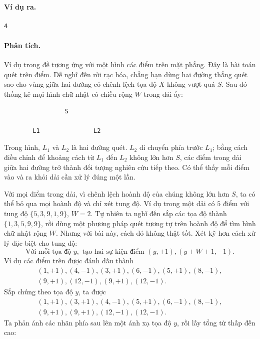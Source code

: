 \documentclass[11pt]{article}
\begin{document}
\paragraph{Ví dụ ra.}
\begin{verbatim}
4
\end{verbatim}

\paragraph{Phân tích.}
Ví dụ trong đề tương ứng với một hình các điểm trên mặt phẳng. Đây là bài toán
quét trên điểm. Dễ nghĩ đến rời rạc hóa, chẳng hạn dùng hai đường thẳng quét
sao cho vùng giữa hai đường có chênh lệch tọa độ \(X\) không vượt quá \(S\).
Sau đó thống kê mọi hình chữ nhật có chiều rộng \(W\) trong dải ấy:

\begin{verbatim}
                 S

        L1               L2
\end{verbatim}

Trong hình, \(L_1\) và \(L_2\) là hai đường quét. \(L_2\) di chuyển phía trước
\(L_1\); bằng cách điều chỉnh để khoảng cách từ \(L_1\) đến \(L_2\) không lớn
hơn \(S\), các điểm trong dải giữa hai đường trở thành đối tượng nghiên cứu
tiếp theo. Có thể thấy mỗi điểm vào và ra khỏi dải cần xử lý đúng một lần.

Với mọi điểm trong dải, vì chênh lệch hoành độ của chúng không lớn hơn \(S\),
ta có thể bỏ qua mọi hoành độ và chỉ xét tung độ. Ví dụ trong một dải có
\(5\) điểm với tung độ \(\{5,3,9,1,9\}\), \(W=2\). Tự nhiên ta nghĩ đến sắp
các tọa độ thành \(\{1,3,5,9,9\}\), rồi dùng một phương pháp quét tương tự
trên hoành độ để tìm hình chữ nhật rộng \(W\). Nhưng với bài này, cách đó
không thật tốt. Xét kỹ hơn cách xử lý đặc biệt cho tung độ:
\[
  \text{Với mỗi tọa độ }y,\text{ tạo hai sự kiện điểm }(y,+1),(y+W+1,-1).
\]
Ví dụ các điểm trên được đánh dấu thành
\[
\begin{gathered}
(1,+1),(4,-1),(3,+1),(6,-1),(5,+1),(8,-1),\\
(9,+1),(12,-1),(9,+1),(12,-1).
\end{gathered}
\]
Sắp chúng theo tọa độ \(y\), ta được
\[
\begin{gathered}
(1,+1),(3,+1),(4,-1),(5,+1),(6,-1),(8,-1),\\
(9,+1),(9,+1),(12,-1),(12,-1).
\end{gathered}
\]
Ta phản ánh các nhãn phía sau lên một ánh xạ tọa độ \(y\), rồi lấy tổng từ
thấp đến cao:
\end{document}
